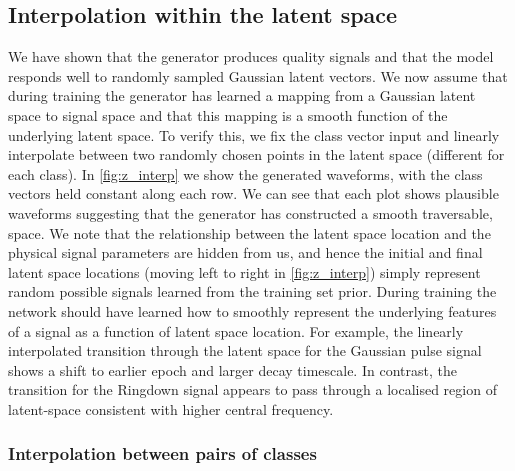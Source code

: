 \documentclass[12pt]{iopart}
\begin{document}
\subsection{Interpolation within the latent space}
%
%
 We have shown that the generator produces quality signals and that the model responds well to randomly sampled Gaussian latent vectors. We now assume that during training the generator has learned a mapping from a Gaussian latent space to signal space and that this mapping is a smooth function of the underlying latent space. To verify this, we fix the class vector input and linearly interpolate between two randomly chosen points in the latent space (different for each class). In \cref{fig:z_interp} we show the generated waveforms, with the class vectors held constant along each row. We can see that each plot shows plausible waveforms suggesting that the generator has constructed a smooth traversable, space. We note that the relationship between the latent space location and the physical signal parameters are hidden from us, and hence the initial and final latent space locations (moving left to right in \cref{fig:z_interp}) simply represent random possible signals learned from the training set prior. During training the network should have learned how to smoothly represent the underlying features of a signal as a function of latent space location. For example, the linearly interpolated transition through the latent space for the Gaussian pulse signal shows a shift to earlier epoch and larger decay timescale. In contrast, the transition for the Ringdown signal appears to pass through a localised region of latent-space consistent with higher central frequency. 
\subsubsection{Interpolation between pairs of classes}
\end{document}
